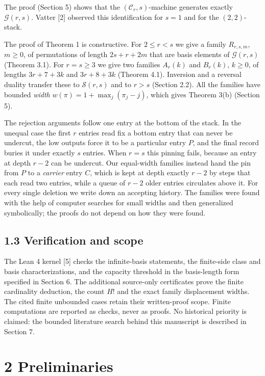 \documentclass[11pt,letterpaper]{article}
\begin{document}
The proof (Section 5) shows that the \((\mathcal C_r,s)\)-machine
generates exactly \(\mathcal G(r,s)\). Vatter {[}2{]} observed this
identification for \(s=1\) and for the \((2,2)\)-stack.

The proof of Theorem 1 is constructive. For \(2\le r<s\) we give a
family \(R_{r,s,m}\), \(m\ge0\), of permutations of length \(2s+r+2m\)
that are basis elements of \(\mathcal G(r,s)\) (Theorem 3.1). For
\(r=s\ge3\) we give two families \(A_r(k)\) and \(B_r(k)\), \(k\ge0\),
of lengths \(3r+7+3k\) and \(3r+8+3k\) (Theorem 4.1). Inversion and a
reversal duality transfer these to \(\mathcal S(r,s)\) and to \(r>s\)
(Section 2.2). All the families have bounded \emph{width}
\(w(\pi)=1+\max_j(\pi_j-j)\), which gives Theorem 3(b) (Section 5).

The rejection arguments follow one entry at the bottom of the stack. In
the unequal case the first \(r\) entries read fix a bottom entry that
can never be undercut, the low outputs force it to be a particular entry
\(P\), and the final record buries it under exactly \(s\) entries. When
\(r=s\) this pinning fails, because an entry at depth \(r-2\) can be
undercut. Our equal-width families instead hand the pin from \(P\) to a
\emph{carrier} entry \(C\), which is kept at depth exactly \(r-2\) by
steps that each read two entries, while a queue of \(r-2\) older entries
circulates above it. For every single deletion we write down an
accepting history. The families were found with the help of computer
searches for small widths and then generalized symbolically; the proofs do not depend on how they were found.

\subsection{1.3 Verification and scope}\label{verification-and-provenance}

The Lean 4 kernel {[}5{]} checks the
infinite-basis statements, the finite-side class and basis
characterizations, and the capacity threshold in the basis-length form
specified in Section 6. The additional source-only certificates prove the finite cardinality deduction, the count \(H!\) and the exact family displacement widths. The cited finite unbounded cases retain their written-proof scope. Finite computations are reported as checks,
never as proofs. No historical priority is claimed: the bounded
literature search behind this manuscript is described in Section 7.

\section{2 Preliminaries}\label{preliminaries}
\end{document}
